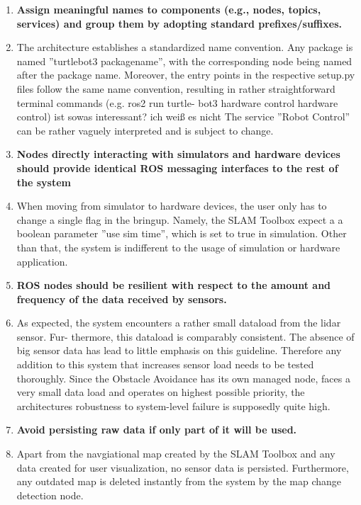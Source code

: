 \documentclass[]{article}
\begin{document}
\begin{enumerate}[leftmargin=9mm, align=left]
		\item  \textbf{Assign meaningful names to components (e.g., nodes, topics, services) and group them by adopting standard prefixes/suffixes.} 
		\item[] The architecture establishes a standardized name convention. Any package is named ”turtlebot3 packagename”, with the corresponding node being named after the package name. Moreover, the entry points in the respective setup.py files follow the same name convention, resulting in rather straightforward terminal commands (e.g. ros2 run turtle- bot3 hardware control hardware control) ist sowas interessant? ich weiß es nicht
		The service ”Robot Control” can be rather vaguely interpreted and is subject to change.
		
		\item  \textbf{Nodes directly interacting with simulators and hardware devices should provide identical ROS messaging interfaces to the rest of the system} 
		\item[] When moving from simulator to hardware devices, the user only has to change a single flag in the bringup. Namely, the SLAM Toolbox expect a a boolean parameter ”use sim time”, which is set to true in simulation. Other than that, the system is indifferent to the usage of simulation or hardware application.
		
		\item \textbf{ROS nodes should be resilient with respect to the amount and frequency of the data received by sensors.} 
		\item[] As expected, the system encounters a rather small dataload from the lidar sensor. Fur- thermore, this dataload is comparably consistent. The absence of big sensor data has lead to little emphasis on this guideline. Therefore any addition to this system that increases sensor load needs to be tested thoroughly. Since the Obstacle Avoidance has its own managed node, faces a very small data load and operates on highest possible priority, the architectures robustness to system-level failure is supposedly quite high.
		
		\item \textbf{Avoid persisting raw data if only part of it will be used.}
		\item[] Apart from the navgiational map created by the SLAM Toolbox and any data created for user visualization, no sensor data is persisted. Furthermore, any outdated map is deleted instantly from the system by the map change detection node.
		
		
	\end{enumerate}
	
\end{document}
